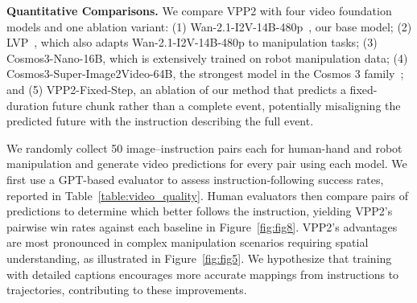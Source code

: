 \textbf{Quantitative Comparisons.}
We compare VPP2 with four video foundation models and one ablation variant: (1) Wan-2.1-I2V-14B-480p~\citep{wan2025wan}, our base model; (2) LVP~\citep{chen2025large}, which also adapts Wan-2.1-I2V-14B-480p to manipulation tasks; (3) Cosmos3-Nano-16B, which is extensively trained on robot manipulation data; (4) Cosmos3-Super-Image2Video-64B, the strongest model in the Cosmos 3 family~\citep{agarwal2026cosmos}; and (5) VPP2-Fixed-Step, an ablation of our method that predicts a fixed-duration future chunk rather than a complete event, potentially misaligning the predicted future with the instruction describing the full event.

We randomly collect 50 image--instruction pairs each for human-hand and robot manipulation and generate video predictions for every pair using each model. We first use a GPT-based evaluator to assess instruction-following success rates, reported in Table~\ref{table:video_quality}. Human evaluators then compare pairs of predictions to determine which better follows the instruction, yielding VPP2's pairwise win rates against each baseline in Figure~\ref{fig:fig8}. VPP2's advantages are most pronounced in complex manipulation scenarios requiring spatial understanding, as illustrated in Figure~\ref{fig:fig5}. We hypothesize that training with detailed captions encourages more accurate mappings from instructions to trajectories, contributing to these improvements.


